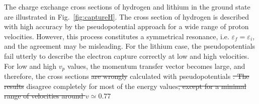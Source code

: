 \documentclass[10pt]{article}
\providecommand{\DIFdeltex}[1]{{\protect\color{red}\sout{#1}}}                      %
\providecommand{\DIFdelbegin}{} %
\providecommand{\DIFdelend}{} %
\providecommand{\DIFdel}[1]{\texorpdfstring{\DIFdeltex{#1}}{}} %
\begin{document}
The charge exchange cross sections of hydrogen and lithium in the 
ground state are illustrated in Fig.~\ref{fig:captureH}. The cross 
section of hydrogen is described with high accuracy by the 
pseudopotential approach for a wide range of proton velocities. 
However, this process constitutes a symmetrical resonance, i.e. 
$\varepsilon_{\!f}=\varepsilon_{\!i}$, and the agreement may be 
misleading. For the lithium case, the pseudopotentials fail utterly 
to describe the electron capture correctly at low and high velocities.
For low and high $v_p$ values, the momentum transfer vector becomes 
large, and therefore, the cross sections \DIFdelbegin \DIFdel{are wrongly }\DIFdelend calculated with 
pseudopotentials \DIFdelbegin \DIFdel{. 
The results }\DIFdelend disagree completely for most of the energy values\DIFdelbegin \DIFdel{, except
for a minimal range of velocities around $v\simeq0.77$}%
\end{document}
